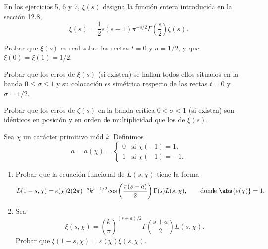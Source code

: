 \documentclass[12pt,a4paper]{book}
\begin{document}
    En los ejercicios 5, 6 y 7, $\xi(s)$ designa la función entera introducida en la sección
    12.8,
    \begin{equation*}
        \xi(s)=\frac{1}{2}s(s-1)\pi^{-s/2}\Gamma\left(\frac{s}{2}\right)\zeta(s).
    \end{equation*}

    \begin{ejercicio}
        Probar que $\xi(s)$ es real sobre las rectas $t=0$ y $\sigma=1/2$, y que
        $\xi(0)=\xi(1)=1/2$.
    \end{ejercicio}

    \begin{ejercicio}
        Probar que los ceros de $\xi(s)$ (si existen) se hallan todos ellos situados en la
        banda $0\leq\sigma\leq1$ y su colocación es simétrica respecto de las rectas $t=0$ y
        $\sigma=1/2$.
    \end{ejercicio}

    \begin{ejercicio}
        Probar que los ceros de $\zeta(s)$ en la banda crítica $0<\sigma<1$ (si existen) son
        idénticos en posición y en orden de multiplicidad que los de $\xi(s)$.
    \end{ejercicio}

    \begin{ejercicio}
        Sea $\chi$ un carácter primitivo mód $k$. Definimos
        \begin{equation*}
            a=a(\chi)=
            \begin{cases}
                0&\text{si }\chi(-1)=1,\\
                1&\text{si }\chi(-1)=-1.
            \end{cases}
        \end{equation*}
        \begin{enumerate}
            \item[(a)] Probar que la ecuación funcional de $L(s,\chi)$ tiene la forma
            \begin{equation*}
                L(1-s,\bar{\chi})=\varepsilon(\chi)2(2\pi)^{-s}k^{s-1/2}\cos\left(\frac{\pi(s-a)}{2}\right)\Gamma(s)L(s,\chi),\qquad\text{donde }\abs{\varepsilon(\chi)}=1.
            \end{equation*}
            \item[(b)] Sea
            \begin{equation*}
                \xi(s,\chi)=\left(\frac{k}{\pi}\right)^{(s+a)/2}\Gamma\left(\frac{s+a}{2}\right)L(s,\chi).
            \end{equation*}
            Probar que $\xi(1-s,\bar{\chi})=\varepsilon(\chi)\xi(s,\chi)$.
        \end{enumerate}
    \end{ejercicio}
\end{document}

